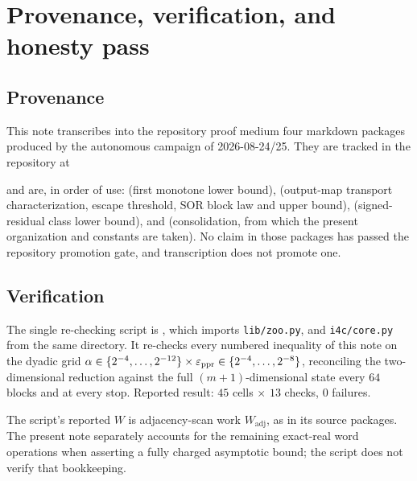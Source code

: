 \section{Provenance, verification, and honesty pass}
\label{sec:ladder-verification}

\subsection*{Provenance}

This note transcribes into the repository proof medium four markdown packages
produced by the autonomous campaign of 2026-08-24/25. They are tracked in the
repository at
\begin{center}
\end{center}
and are, in order of use:
 (first monotone lower bound),
 (output-map transport characterization,
escape threshold, SOR block law and upper bound),
 (signed-residual class lower bound), and
 (consolidation, from which the present
organization and constants are taken). No claim in those packages has passed
the repository promotion gate, and transcription does not promote one.

\subsection*{Verification}

The single re-checking script is
, which
imports \texttt{lib/zoo.py},  and
\texttt{i4c/core.py} from the same directory. It re-checks every numbered
inequality of this note on the dyadic grid
$\alpha\in\{2^{-4},\ldots,2^{-12}\}\times\varepsilon_{\mathrm{ppr}}\in\{2^{-4},\ldots,2^{-8}\}$,
reconciling the two-dimensional reduction against the full
$(m+1)$-dimensional state every $64$ blocks and at every stop. Reported
result: $45$ cells $\times$ $13$ checks, $0$ failures.

The script's reported $W$ is adjacency-scan work
$W_{\mathrm{adj}}$, as in its source packages. The present note separately
accounts for the remaining exact-real word operations when asserting a fully
charged asymptotic bound; the script does not verify that bookkeeping.

